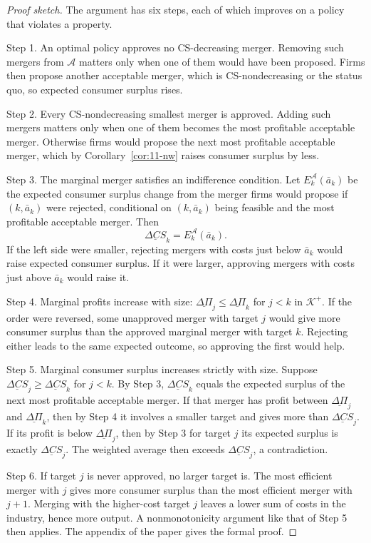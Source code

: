 \begin{proof}[Proof sketch]
The argument has six steps, each of which improves on a policy that violates a property.

Step 1. An optimal policy approves no CS-decreasing merger. Removing such mergers from $\mathcal{A}$ matters only when
one of them would have been proposed. Firms then propose another acceptable merger, which is CS-nondecreasing or the
status quo, so expected consumer surplus rises.

Step 2. Every CS-nondecreasing smallest merger is approved. Adding such mergers matters only when one of them becomes
the most profitable acceptable merger. Otherwise firms would propose the next most profitable acceptable merger, which
by Corollary~\ref{cor:11-nw} raises consumer surplus by less.

Step 3. The marginal merger satisfies an indifference condition. Let $E^{\mathcal{A}}_k(\bar a_k)$ be the expected
consumer surplus change from the merger firms would propose if $(k, \bar a_k)$ were rejected, conditional on $(k, \bar
a_k)$ being feasible and the most profitable acceptable merger. Then
\begin{equation}\label{eq:11-nw-indiff}
\underline{\Delta\mathit{CS}}_k = E^{\mathcal{A}}_k(\bar a_k).
\end{equation}
If the left side were smaller, rejecting mergers with costs just below $\bar a_k$ would raise expected consumer surplus.
If it were larger, approving mergers with costs just above $\bar a_k$ would raise it.

Step 4. Marginal profits increase with size: $\underline{\Delta\Pi}_j \le \underline{\Delta\Pi}_k$ for $j < k$ in
$\mathcal{K}^+$. If the order were reversed, some unapproved merger with target $j$ would give more consumer surplus
than the approved marginal merger with target $k$. Rejecting either leads to the same expected outcome, so approving the
first would help.

Step 5. Marginal consumer surplus increases strictly with size. Suppose $\underline{\Delta\mathit{CS}}_j \ge
\underline{\Delta\mathit{CS}}_k$ for $j < k$. By Step 3, $\underline{\Delta\mathit{CS}}_k$ equals the expected surplus of
the next most profitable acceptable merger. If that merger has profit between $\underline{\Delta\Pi}_j$ and
$\underline{\Delta\Pi}_k$, then by Step 4 it involves a smaller target and gives more than
$\underline{\Delta\mathit{CS}}_j$. If its profit is below $\underline{\Delta\Pi}_j$, then by Step 3 for target $j$ its
expected surplus is exactly $\underline{\Delta\mathit{CS}}_j$. The weighted average then exceeds
$\underline{\Delta\mathit{CS}}_j$, a contradiction.

Step 6. If target $j$ is never approved, no larger target is. The most efficient merger with $j$ gives more consumer
surplus than the most efficient merger with $j + 1$. Merging with the higher-cost target $j$ leaves a lower sum of
costs in the industry, hence more output. A nonmonotonicity argument
like that of Step 5 then applies. The appendix of the paper gives the formal proof.
\end{proof}

